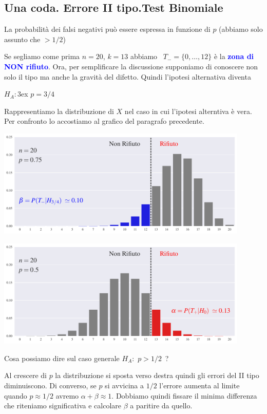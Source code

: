 \documentclass[10pt,openany]{book}
\def\emph#1{\textcolor{blue}{\textbf{\boldmath #1}}}
\theoremstyle{mio}
\theoremstyle{liscio}
\begin{document}
\clearpage\subsection{Una coda. Errore II tipo.\hfill Test Binomiale}

La probabilità dei falsi negativi può essere espressa in funzione di $p$ (abbiamo solo assunto che $>1/2$)



Se segliamo come prima $n=20$, $k=13$ abbiamo {\color{blue}\boldmath\ $T_-=\{0,\dots,12\}$} è la \emph{zona di NON rifiuto}.
Ora, per semplificare la discussione supponiamo di conoscere non solo il tipo ma anche la gravità del difetto. Quindi l'ipotesi alternativa diventa

$H_A:$\kern3ex $p=3/4$

Rappresentiamo la distribuzione di $X$ nel caso in cui l'ipotesi alterntiva è vera. Per confronto lo accostiamo al grafico del paragrafo precedente. 


\hfil\includegraphics[width=0.9\textwidth]{figure/B-test_02.pdf}

\hfil\includegraphics[width=0.9\textwidth]{figure/B-test_01.pdf}

Cosa possiamo dire sul caso generale $H_A:$ $p>1/2$~?

Al crescere di $p$ la distribuzione si sposta verso destra quindi gli errori del II tipo diminuiscono. Di converso, se $p$ si avvicina a $1/2$ l'errore aumenta al limite quando $p\approx 1/2$ avremo $\alpha+\beta\approx 1$. Dobbiamo quindi fissare il minima differenza che riteniamo significativa e calcolare $\beta$ a paritire da quello.
\end{document}

